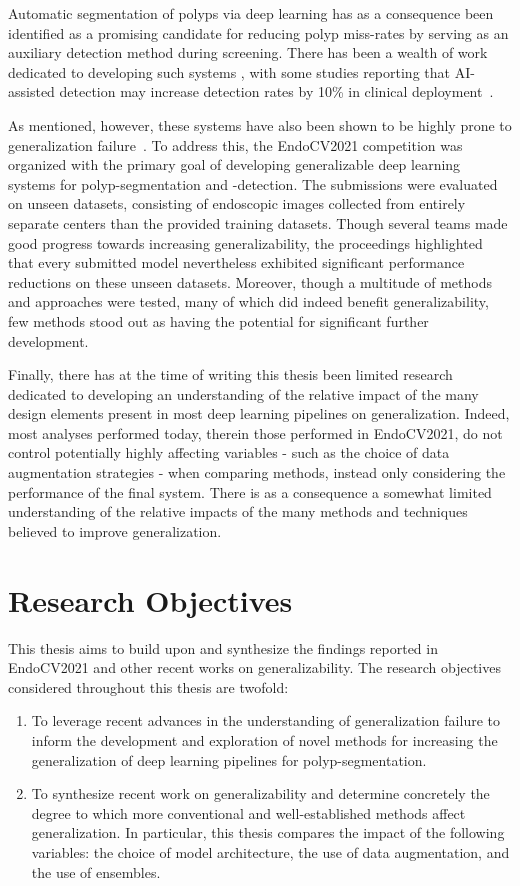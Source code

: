     Automatic segmentation of polyps via deep learning has as a consequence been identified as a promising candidate for reducing polyp miss-rates by serving as an auxiliary detection method during screening. There has been a wealth of work dedicated to developing such systems \cite{endocv2020, endocv2021, ddanet}, with some studies reporting that AI-assisted detection may increase detection rates by 10\% in clinical deployment~\cite{polyp-success-story}.  
    
    As mentioned, however, these systems have also been shown to be highly prone to generalization failure~\cite{endocv2021}. To address this, the EndoCV2021 competition \cite{endocv2021} was organized with the primary goal of developing generalizable deep learning systems for polyp-segmentation and -detection. The submissions were evaluated on unseen datasets, consisting of endoscopic images collected from entirely separate centers than the provided training datasets. Though several teams made good progress towards increasing generalizability, the proceedings highlighted that every submitted model nevertheless exhibited significant performance reductions on these unseen datasets. Moreover, though a multitude of methods and approaches were tested, many of which did indeed benefit generalizability, few methods stood out as having the potential for significant further development.

    Finally, there has at the time of writing this thesis been limited research dedicated to developing an understanding of the relative impact of the many design elements present in most deep learning pipelines on generalization. Indeed, most analyses performed today, therein those performed in EndoCV2021, do not control potentially highly affecting variables - such as the choice of data augmentation strategies -  when comparing methods, instead only considering the performance of the final system. There is as a consequence a somewhat limited understanding of the relative impacts of the many methods and techniques believed to improve generalization.  
    
    \section{Research Objectives}
    This thesis aims to build upon and synthesize the findings reported in EndoCV2021 and other recent works on generalizability. The research objectives considered throughout this thesis are twofold:
    \begin{enumerate}
        \item To leverage recent advances in the understanding of generalization failure to inform the development and exploration of novel methods for increasing the generalization of deep learning pipelines for polyp-segmentation. \label{cont_1}
        \item To synthesize recent work on generalizability and determine concretely the degree to which more conventional and well-established methods affect generalization. In particular, this thesis compares the impact of the following variables: the choice of model architecture, the use of data augmentation, and the use of ensembles. \label{cont_2}
    \end{enumerate}
   

